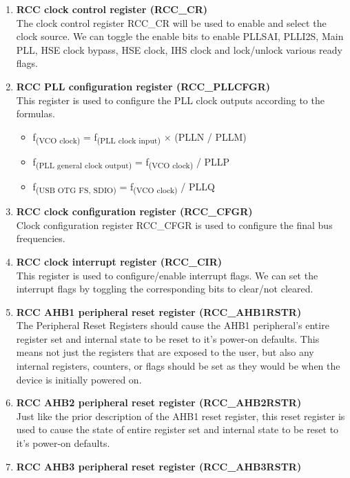 \documentclass[footheight=20pt, footsepline, headheight=20pt, headsepline]{scrartcl}
\begin{document}
\begin{enumerate}
    \item \textbf{RCC clock control register (RCC\_CR)}
    \\ The clock control register RCC\_CR will be used to enable and select the clock source. We can toggle the enable bits to enable PLLSAI, PLLI2S, Main PLL, HSE clock bypass, HSE clock, IHS clock and lock/unlock various ready flags.
    \item \textbf{RCC PLL configuration register (RCC\_PLLCFGR)}
    \\ This register is used to configure the PLL clock outputs according to the formulas.
        \begin{itemize}
            \item f\textsubscript{(VCO clock)} = f\textsubscript{(PLL clock input)} × (PLLN / PLLM)
            \item f\textsubscript{(PLL general clock output)} = f\textsubscript{(VCO clock)} / PLLP
            \item f\textsubscript{(USB OTG FS, SDIO)} = f\textsubscript{(VCO clock)} / PLLQ
        \end{itemize}
    \item \textbf{RCC clock configuration register (RCC\_CFGR)}
    \\  Clock configuration register RCC\_CFGR is used to configure the final bus frequencies. 
    \item\textbf{RCC clock interrupt register (RCC\_CIR)}
    \\ This register is used to configure/enable interrupt flags. We can set the interrupt flags by toggling the corresponding bits to clear/not cleared.
    \item\textbf{RCC AHB1 peripheral reset register (RCC\_AHB1RSTR)}
    \\ The Peripheral Reset Registers should cause the AHB1 peripheral's entire register set and internal state to be reset to it's power-on defaults. This means not just the registers that are exposed to the user, but also any internal registers, counters, or flags should be set as they would be when the device is initially powered on.
    \item\textbf{RCC AHB2 peripheral reset register (RCC\_AHB2RSTR)}
    \\ Just like the prior description of the AHB1 reset register, this reset register is used to cause the state of entire register set and internal state to be reset to it's power-on defaults.
    \item\textbf{RCC AHB3 peripheral reset register (RCC\_AHB3RSTR)}    

\end{enumerate}
\end{document}

